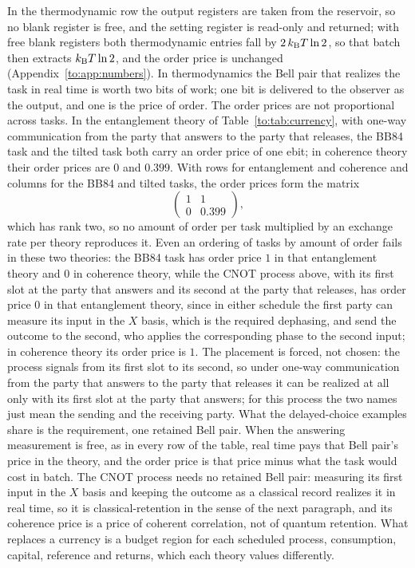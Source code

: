 In the thermodynamic row the output registers are taken from the reservoir, so no blank register is free, and the setting register is read-only and returned; with free blank registers both thermodynamic entries fall by $2\,k_{\mathrm B} T\ln2$, so that batch then extracts $k_{\mathrm B} T\ln2$, and the order price is unchanged (Appendix~\ref{to:app:numbers}). In thermodynamics the Bell pair that realizes the task in real time is worth two bits of work; one bit is delivered to the observer as the output, and one is the price of order. The order prices are not proportional across tasks. In the entanglement theory of Table~\ref{to:tab:currency}, with one-way communication from the party that answers to the party that releases, the BB84 task and the tilted task both carry an order price of one ebit; in coherence theory their order prices are $0$ and $0.399$. With rows for entanglement and coherence and columns for the BB84 and tilted tasks, the order prices form the matrix
\[
\begin{pmatrix}1&1\\0&0.399\end{pmatrix},
\]
which has rank two, so no amount of order per task multiplied by an exchange rate per theory reproduces it. Even an ordering of tasks by amount of order fails in these two theories: the BB84 task has order price $1$ in that entanglement theory and $0$ in coherence theory, while the CNOT process above, with its first slot at the party that answers and its second at the party that releases, has order price $0$ in that entanglement theory, since in either schedule the first party can measure its input in the $X$ basis, which is the required dephasing, and send the outcome to the second, who applies the corresponding phase to the second input; in coherence theory its order price is $1$. The placement is forced, not chosen: the process signals from its first slot to its second, so under one-way communication from the party that answers to the party that releases it can be realized at all only with its first slot at the party that answers; for this process the two names just mean the sending and the receiving party. What the delayed-choice examples share is the requirement, one retained Bell pair. When the answering measurement is free, as in every row of the table, real time pays that Bell pair's price in the theory, and the order price is that price minus what the task would cost in batch. The CNOT process needs no retained Bell pair: measuring its first input in the $X$ basis and keeping the outcome as a classical record realizes it in real time, so it is classical-retention in the sense of the next paragraph, and its coherence price is a price of coherent correlation, not of quantum retention. What replaces a currency is a budget region for each scheduled process, consumption, capital, reference and returns, which each theory values differently.

